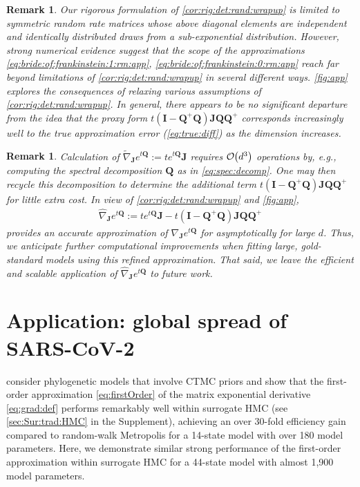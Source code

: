 \documentclass[9pt,twocolumn,twoside]{pnas-new}
\newtheorem{Remark}[Theorem]{Remark}
\newcommand{\order}[1]{{\cal O}\hspace{-0.2em}\left( #1 \right)}
\newcommand{\?}{\textbf{?}}
\newcommand{\QQ}{\mathbf{Q}}
\newcommand{\JJ}{\mathbf{J}}
\newcommand{\II}{\mathbf{I}}
\begin{document}
\begin{Remark}\label{rmk:non:sym:num:ev}
  Our rigorous formulation of \cref{cor:rig:det:rand:wrapup} is
  limited to symmetric random rate matrices whose above diagonal
  elements are independent and identically distributed draws from a
  sub-exponential distribution. However, strong numerical evidence
  suggest that the scope of the approximations
  \eqref{eq:bride:of:frankinstein:1:rm:app},
  \eqref{eq:bride:of:frankinstein:0:rm:app} reach far beyond
  limitations of \cref{cor:rig:det:rand:wrapup} in several different
  ways. \cref{fig:app} explores the
  consequences of relaxing various assumptions of
  \cref{cor:rig:det:rand:wrapup}. In general, there appears to be no
  significant departure from the idea that the proxy form
  $t(\II -\QQ^+ \QQ) \JJ \QQ \QQ^{+}$ corresponds increasingly well to
  the true approximation error (\eqref{eq:true:diff}) as the dimension
  increases.
\end{Remark}

\begin{Remark}\label{rmk:better:approx}
  Calculation of
  $\widetilde{\nabla}_{\JJ} e^{t\QQ} := t e^{t\QQ} \JJ$ requires
  $\order{d^3}$ operations by, e.g., computing the spectral
  decomposition $\QQ$ as in \eqref{eq:spec:decomp}.  One may then recycle this
  decomposition to determine the
  additional term $t(\II -\QQ^+ \QQ) \JJ \QQ \QQ^{+}$ for little extra cost.  In view of
  \cref{cor:rig:det:rand:wrapup} and \cref{fig:app},
  \begin{align}\label{eq:better:help:on:sale}
    \widehat{\nabla}_{\JJ} e^{t\QQ} := t e^{t\QQ} \JJ
    -t(\II -\QQ^+ \QQ) \JJ \QQ \QQ^{+}
  \end{align}
  provides an accurate approximation of $\nabla_{\JJ} e^{t\QQ}$ for
  asymptotically for large $d$. Thus, we anticipate further computational improvements when fitting
  large, gold-standard models using this
  refined approximation.  That said, we leave the efficient and scalable application of $\widehat{\nabla}_{\JJ} e^{t\QQ}$ to future work.
\end{Remark}

\section{Application: global spread of SARS-CoV-2}
\label{sec:sars:cov:app}



\cite{magee2023random} consider phylogenetic models that involve CTMC
priors and show that the first-order approximation
\eqref{eq:firstOrder} of the matrix exponential derivative
\eqref{eq:grad:def} performs remarkably well within surrogate HMC (see
\cref{sec:Sur:trad:HMC} in the Supplement), achieving an over 30-fold
efficiency gain compared to random-walk Metropolis for a 14-state
model with over 180 model parameters.  Here, we demonstrate similar
strong performance of the first-order approximation within surrogate
HMC for a 44-state model with almost 1,900 model parameters.
\end{document}
